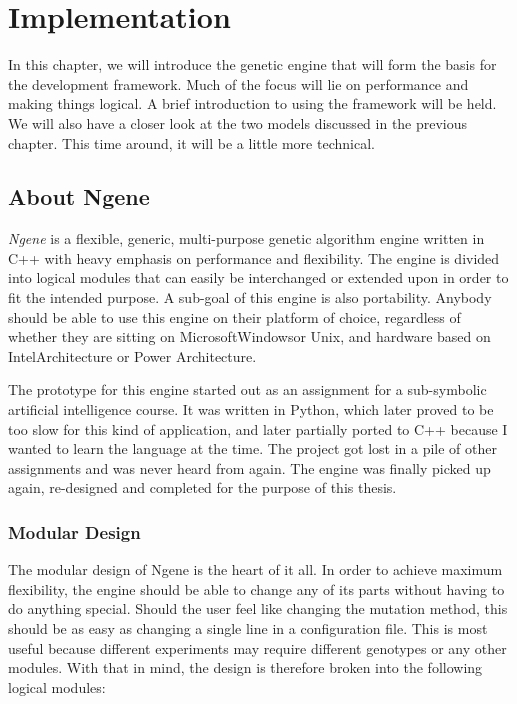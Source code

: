 \section{Implementation}
\label{sec:implementation}
In this chapter, we will introduce the genetic engine that will form the basis for the development framework. Much of the focus will lie on performance and making things logical. A brief introduction to using the framework will be held. We will also have a closer look at the two models discussed in the previous chapter. This time around, it will be a little more technical.


\subsection{About Ngene}
\emph{Ngene} is a flexible, generic, multi-purpose genetic algorithm engine written in C++ with heavy emphasis on performance and flexibility. The engine is divided into logical modules that can easily be interchanged or extended upon in order to fit the intended purpose. A sub-goal of this engine is also portability. Anybody should be able to use this engine on their platform of choice, regardless of whether they are sitting on Microsoft\textregistered Windows\texttrademark or Unix, and hardware based on Intel\textregistered Architecture or Power Architecture.

The prototype for this engine started out as an assignment for a sub-symbolic artificial intelligence course. It was written in Python, which later proved to be too slow for this kind of application, and later partially ported to C++ because I wanted to learn the language at the time. The project got lost in a pile of other assignments and was never heard from again. The engine was finally picked up again, re-designed and completed for the purpose of this thesis.

\subsubsection{Modular Design}
The modular design of Ngene is the heart of it all. In order to achieve maximum flexibility, the engine should be able to change any of its parts without having to do anything special. Should the user feel like changing the mutation method, this should be as easy as changing a single line in a configuration file. This is most useful because different experiments may require different genotypes or any other modules. With that in mind, the design is therefore broken into the following logical modules:

